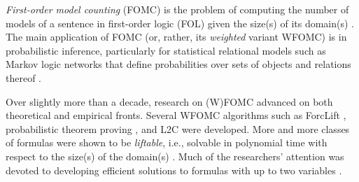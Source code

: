 

\emph{First-order model counting} (FOMC) is the problem of computing the number
of models of a sentence in first-order logic (FOL) given the size(s) of its
domain(s) \citep{DBLP:conf/ijcai/BroeckTMDR11}. The main application of FOMC
(or, rather, its \emph{weighted} variant WFOMC) is in probabilistic inference,
particularly for statistical relational models such as Markov logic networks
that define probabilities over sets of objects and relations thereof
\citep{DBLP:conf/ijcai/BroeckTMDR11,DBLP:journals/cacm/GogateD16}.

Over slightly more than a decade, research on (W)FOMC advanced on both
theoretical and empirical fronts. Several WFOMC algorithms such as ForcLift
\citep{DBLP:conf/ijcai/BroeckTMDR11}, probabilistic theorem proving
\citep{DBLP:journals/cacm/GogateD16}, and L2C \citep{DBLP:conf/kr/KazemiP16}
were developed. More and more classes of formulas were shown to be
\emph{liftable}, i.e., solvable in polynomial time with respect to the size(s)
of the domain(s)
\citep{DBLP:conf/kr/BremenK21,DBLP:conf/nips/KazemiKBP16,DBLP:conf/lics/KuusistoL18,DBLP:journals/jair/Kuzelka21}.
Much of the researchers' attention was devoted to developing efficient solutions
to formulas with up to two variables
\citep{DBLP:conf/uai/BremenK21,DBLP:journals/corr/abs-2110-05992}.

